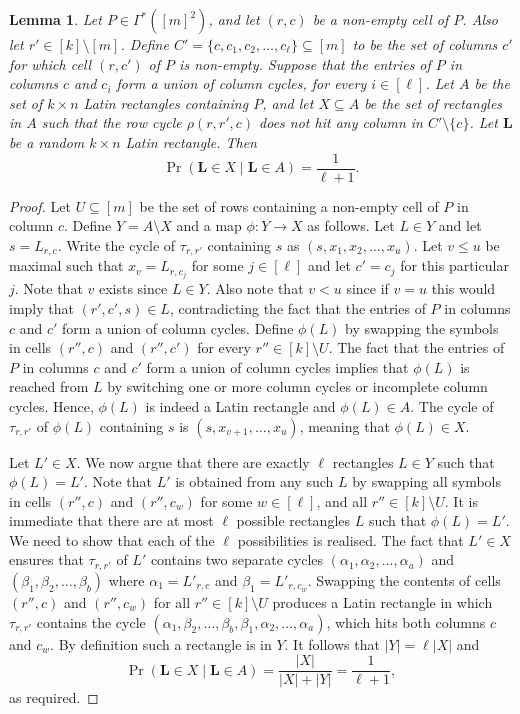 \documentclass[12pt]{article}
\newtheorem{lem}[thm]{Lemma}
\theoremstyle{definition}
\numberwithin{equation}{section}
\renewcommand{\leq}{\leqslant}
\renewcommand{\L}{\mathbf{L}}
\begin{document}
	\begin{lem}\label{l:prelim}
		Let $P \in \Gamma^*([m]^2)$, and let $(r, c)$ be a non-empty cell of
		$P$.  Also let $r' \in [k]\setminus [m]$. Define
		$C'=\{c,c_1,c_2,\ldots,c_\ell\}\subseteq[m]$ to be the set of columns
		$c'$ for which cell $(r,c')$ of $P$ is non-empty.
		Suppose that
		the entries of $P$ in columns $c$ and $c_i$ form a union of column
		cycles, for every $i \in [\ell]$.  
		Let $A$ be the set of $k \times n$ Latin rectangles containing $P$, and
		let $X\subseteq A$ be the set of rectangles in $A$ such that
		the row cycle $\rho(r, r', c)$ does not hit any column in $C'\setminus\{c\}$.
		Let $\L$ be a random $k \times n$ Latin rectangle. Then
		\[
		\Pr(\L \in X\mid  \L \in A)=\frac1{\ell+1}.
		\]
	\end{lem}
	
	\begin{proof}
		Let $U \subseteq [m]$ be the set of rows containing a non-empty cell
		of $P$ in column $c$.  Define $Y = A \setminus X$ and a map
		$\phi:Y \to X$ as follows. Let $L \in Y$ and let $s = L_{r, c}$. Write the
		cycle of $\tau_{r, r'}$ containing $s$ as $(s, x_1, x_2, \ldots,x_u)$.
		Let $v \leq u$ be maximal such that $x_v = L_{r, c_j}$
		for some $j \in [\ell]$ and let $c' = c_j$ for this particular
		$j$. Note that $v$ exists since $L \in Y$. Also note that $v<u$
		since if $v = u$ this would imply that $(r', c', s) \in L$,
		contradicting the fact that the entries of $P$ in columns $c$ and
		$c'$ form a union of column cycles. Define $\phi(L)$ by swapping the
		symbols in cells $(r'', c)$ and $(r'', c')$ for every $r'' \in
		[k]\setminus U$. The fact that the entries of $P$ in columns $c$ and
		$c'$ form a union of column cycles implies that $\phi(L)$ is
		reached from $L$ by switching one or more column cycles or incomplete column cycles. 
		Hence, $\phi(L)$ is indeed a Latin rectangle and $\phi(L) \in A$.  The
		cycle of $\tau_{r, r'}$ of $\phi(L)$ containing $s$ is
		$(s,x_{v+1}, \ldots, x_u)$, meaning that $\phi(L) \in X$.
		
		Let $L'\in X$. We now argue that there are exactly $\ell$ rectangles $L\in
		Y$ such that $\phi(L)=L'$. Note that $L'$ is obtained from any such
		$L$ by swapping all symbols in cells $(r'', c)$ and $(r'', c_w)$
		for some $w \in [\ell]$, and all $r'' \in [k] \setminus U$. It is
		immediate that there are at most $\ell$ possible rectangles $L$ such that
		$\phi(L)=L'$. We need to show that each of the $\ell$ possibilities is
		realised.  The fact that $L'\in X$ ensures that $\tau_{r,r'}$ of $L'$
		contains two separate cycles $(\alpha_1,\alpha_2,\ldots,\alpha_a)$ and
		$(\beta_1,\beta_2,\ldots,\beta_b)$ where $\alpha_1=L'_{r,c}$ and
		$\beta_1=L'_{r,c_w}$. Swapping the contents of
		cells $(r'', c)$ and $(r'', c_w)$
		for all $r'' \in [k] \setminus U$ produces a Latin rectangle in which
		$\tau_{r,r'}$ contains the cycle
		$(\alpha_1,\beta_2,\ldots,\beta_b,\beta_1,\alpha_2,\ldots,\alpha_a)$, which hits
		both columns $c$ and $c_w$. By definition
		such a rectangle is in $Y$. 
		It follows that $|Y|=\ell|X|$ and
		\[
		\Pr\left(\L \in X\mid\L \in A\right)=\frac{|X|}{|X|+|Y|}=\frac1{\ell+1},
		\]
		as required.
	\end{proof}
	
\end{document}
